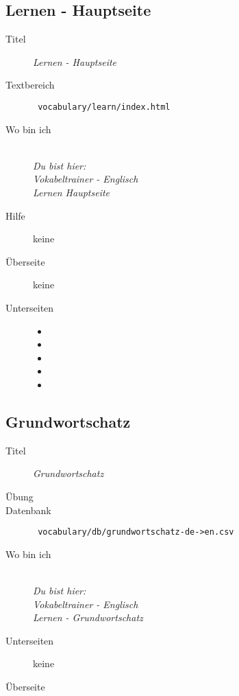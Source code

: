 \subsection{ Lernen - Hauptseite }
\label{has:voc-learn-page0}
\begin{description}
	\item[Titel] \emph{ Lernen - Hauptseite }
	\item[Textbereich] \texttt{ vocabulary/learn/index.html }
	\item[Wo bin ich] \emph{\\Du bist hier:\\Vokabeltrainer - Englisch\\Lernen Hauptseite}
	\item[Hilfe] keine
	\item[Überseite] keine
	\item[Unterseiten]
	\begin{itemize}
		\item {}
		\item {}
		\item {}
		\item {}
		\item {}
	\end{itemize}
\end{description}


\subsection{ Grundwortschatz }
\label{has:voc-learn-page1}
\begin{description}
	\item[Titel] \emph{ Grundwortschatz }
	\item[Übung] 
	\item[Datenbank] \texttt{ vocabulary/db/grundwortschatz-de->en.csv }
	\item[Wo bin ich] \emph{\\Du bist hier:\\Vokabeltrainer - Englisch\\Lernen - Grundwortschatz}
	\item[Unterseiten] keine
	\item[Überseite] 
\end{description}

